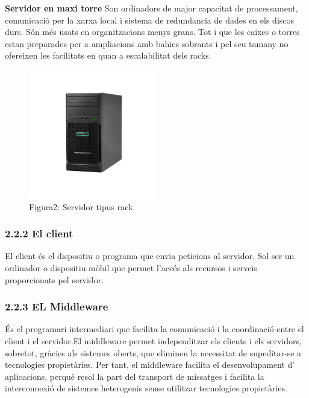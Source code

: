 \documentclass[
  a4paper,
]{article}
\begin{document}
\textbf{Servidor en maxi torre} Son ordinadors de major capacitat de
processament, comunicació per la xarxa local i sistema de redundancia de
dades en els discos durs. Són més usats en organitzacions menys grans.
Tot i que les caixes o torres estan preparades per a ampliacions amb
bahies sobrants i pel seu tamany no ofereixen les facilitats en quan a
escalabilitat dels racks.

\begin{figure}
\centering
\includegraphics[width=0.5\textwidth,height=\textheight]{png/servidorTorre.jpeg}
\caption{Figura2: Servidor tipus rack}
\end{figure}

\subsubsection{2.2.2 El client}\label{el-client}

El client és el dispositiu o programa que envia peticions al servidor.
Sol ser un ordinador o dispositiu mòbil que permet l'accés als recursos
i serveis proporcionats pel servidor.

\subsubsection{2.2.3 EL Middleware}\label{el-middleware}

És el programari intermediari que facilita la comunicació i la
coordinació entre el client i el servidor.El middleware permet
independitzar els clients i els servidors, sobretot, gràcies als
sistemes oberts, que eliminen la necessitat de supeditar-se a
tecnologies propietàries. Per tant, el middleware facilita el
desenvolupament d' aplicacions, perquè resol la part del transport de
missatges i facilita la interconnexió de sistemes heterogenis sense
utilitzar tecnologies propietàries.
\end{document}
